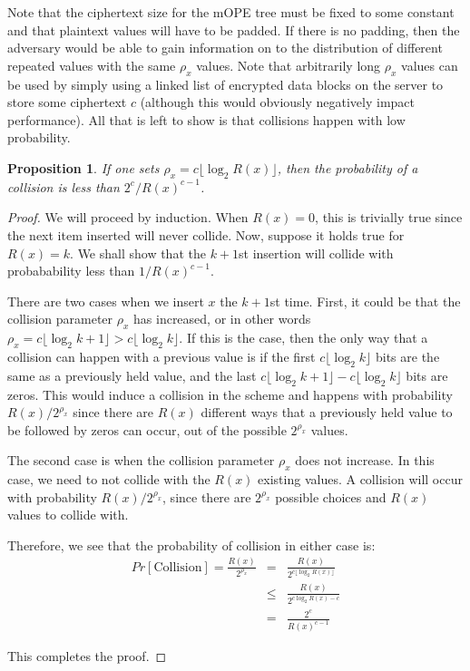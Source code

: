 \documentclass[12pt]{article}
\newtheorem{proposition}[theorem]{Proposition}
\begin{document}
Note that the ciphertext size for the mOPE tree must be fixed to some constant and that plaintext values will have to be padded. If there is no padding, then the adversary would be able to gain information on to the distribution of different repeated values with the same $\rho_x$ values. Note that arbitrarily long $\rho_x$ values can be used by simply using a linked list of encrypted data blocks on the server to store some ciphertext $c$ (although this would obviously negatively impact performance). All that is left to show is that collisions happen with low probability. \\

\begin{proposition}
  If one sets $\rho_x = c \lfloor \log_2 R(x) \rfloor$, then the probability of a collision is less than $2^c/R(x)^{c-1}$.
\end{proposition}
\begin{proof}
  We will proceed by induction. When $R(x) = 0$, this is trivially true since the next item inserted will never collide. Now, suppose it holds true for $R(x) = k$. We shall show that the $k+1$st insertion will collide with probabability less than $1/R(x)^{c-1}$.

  There are two cases when we insert $x$ the $k+1$st time. First, it could be that the collision parameter $\rho_x$ has increased, or in other words $\rho_x = c \lfloor \log_2 k + 1 \rfloor > c \lfloor \log_2 k \rfloor$. If this is the case, then the only way that a collision can happen with a previous value is if the first $c \lfloor \log_2 k \rfloor$ bits are the same as a previously held value, and the last $c \lfloor \log_2 k + 1 \rfloor - c \lfloor \log_2 k \rfloor$ bits are zeros. This would induce a collision in the scheme and happens with probability $R(x) / 2^{\rho_x}$ since there are $R(x)$ different ways that a previously held value to be followed by zeros can occur, out of the possible $2^{\rho_x}$ values.

  The second case is when the collision parameter $\rho_x$ does not increase. In this case, we need to not collide with the $R(x)$ existing values. A collision will occur with probability $R(x) / 2^{\rho_x}$, since there are $2^{\rho_x}$ possible choices and $R(x)$ values to collide with.

  Therefore, we see that the probability of collision in either case is:
  \begin{eqnarray}
    Pr[\textrm{Collision}] = \frac{R(x)}{2^{\rho_x}} &=& \frac{R(x)}{2^{c \lfloor \log_2 R(x) \rfloor}} \\
                                                     &\leq& \frac{R(x)}{2^{c \log_2 R(x) - c}} \\
                                                     &=& \frac{2^c}{R(x)^{c-1}}
  \end{eqnarray}

  This completes the proof.
\end{proof}
\end{document}
